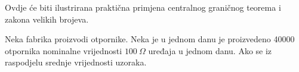 
Ovdje će biti ilustrirana praktična primjena centralnog graničnog teorema i
zakona velikih brojeva.

\begin{exmp}
  Neka fabrika proizvodi otpornike. Neka je u jednom danu je proizvedeno 40000
  otpornika nominalne vrijednosti $100\ \Omega$ uređaja u jednom danu. Ako se iz 
  raspodjelu srednje vrijednosti uzoraka.
\end{exmp}


